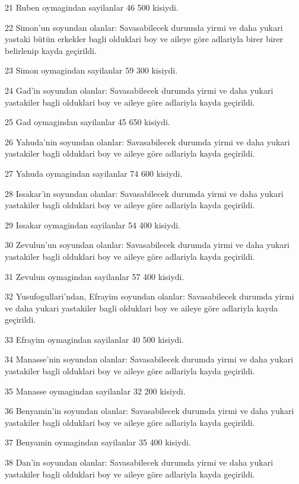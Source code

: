 \par 21 Ruben oymagindan sayilanlar 46 500 kisiydi.
\par 22 Simon'un soyundan olanlar: Savasabilecek durumda yirmi ve daha yukari yastaki bütün erkekler bagli olduklari boy ve aileye göre adlariyla birer birer belirlenip kayda geçirildi.
\par 23 Simon oymagindan sayilanlar 59 300 kisiydi.
\par 24 Gad'in soyundan olanlar: Savasabilecek durumda yirmi ve daha yukari yastakiler bagli olduklari boy ve aileye göre adlariyla kayda geçirildi.
\par 25 Gad oymagindan sayilanlar 45 650 kisiydi.
\par 26 Yahuda'nin soyundan olanlar: Savasabilecek durumda yirmi ve daha yukari yastakiler bagli olduklari boy ve aileye göre adlariyla kayda geçirildi.
\par 27 Yahuda oymagindan sayilanlar 74 600 kisiydi.
\par 28 Issakar'in soyundan olanlar: Savasabilecek durumda yirmi ve daha yukari yastakiler bagli olduklari boy ve aileye göre adlariyla kayda geçirildi.
\par 29 Issakar oymagindan sayilanlar 54 400 kisiydi.
\par 30 Zevulun'un soyundan olanlar: Savasabilecek durumda yirmi ve daha yukari yastakiler bagli olduklari boy ve aileye göre adlariyla kayda geçirildi.
\par 31 Zevulun oymagindan sayilanlar 57 400 kisiydi.
\par 32 Yusufogullari'ndan, Efrayim soyundan olanlar: Savasabilecek durumda yirmi ve daha yukari yastakiler bagli olduklari boy ve aileye göre adlariyla kayda geçirildi.
\par 33 Efrayim oymagindan sayilanlar 40 500 kisiydi.
\par 34 Manasse'nin soyundan olanlar: Savasabilecek durumda yirmi ve daha yukari yastakiler bagli olduklari boy ve aileye göre adlariyla kayda geçirildi.
\par 35 Manasse oymagindan sayilanlar 32 200 kisiydi.
\par 36 Benyamin'in soyundan olanlar: Savasabilecek durumda yirmi ve daha yukari yastakiler bagli olduklari boy ve aileye göre adlariyla kayda geçirildi.
\par 37 Benyamin oymagindan sayilanlar 35 400 kisiydi.
\par 38 Dan'in soyundan olanlar: Savasabilecek durumda yirmi ve daha yukari yastakiler bagli olduklari boy ve aileye göre adlariyla kayda geçirildi.
